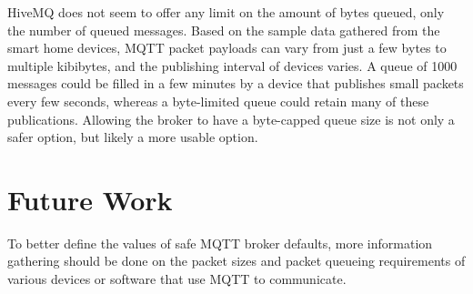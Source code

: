 \documentclass[12pt]{article}
\begin{document}
 HiveMQ does not seem to offer any limit on the amount of bytes queued, only the number of queued messages\cite{hivemq-conf}. Based on the sample data gathered from the smart home devices, MQTT packet payloads can vary from just a few bytes to multiple kibibytes, and the publishing interval of devices varies. A queue of 1000 messages could be filled in a few minutes by a device that publishes small packets every few seconds, whereas a byte-limited queue could retain many of these publications. Allowing the broker to have a byte-capped queue size is not only a safer option, but likely a more usable option.
 
\section{Future Work}
To better define the values of safe MQTT broker defaults, more information gathering should be done on the packet sizes and packet queueing requirements of various devices or software that use MQTT to communicate. 



\end{document}
